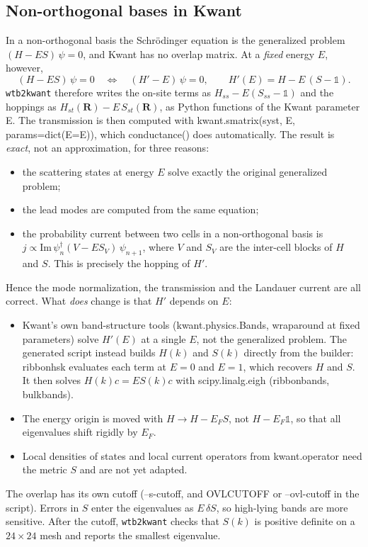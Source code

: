 \documentclass[11pt,a4paper]{article}
\newcommand{\code}[1]{{\ttfamily\def\_{\textunderscore\allowbreak}\def\slash{/\allowbreak}#1}}
\newcommand{\tool}{\texttt{wtb2kwant}}
\begin{document}
\subsection{Non-orthogonal bases in Kwant}\label{sec:nonortho}
In a non-orthogonal basis the Schrödinger equation is the generalized problem
$(H - E S)\,\psi = 0$, and Kwant has no overlap matrix. At a \emph{fixed} energy $E$,
however,
\begin{equation}
  (H - E S)\,\psi = 0 \quad\Longleftrightarrow\quad (H' - E)\,\psi = 0, \qquad
  H'(E) = H - E\,(S - \mathbb{1}).
\end{equation}
\tool{} therefore writes the on-site terms as $H_{ss} - E(S_{ss}-\mathbb{1})$ and the
hoppings as $H_{st}(\mathbf{R}) - E\,S_{st}(\mathbf{R})$, as Python functions of the
Kwant parameter \code{E}. The transmission is then computed with
\code{kwant.smatrix(syst, E, params=dict(E=E))}, which \code{conductance()} does
automatically. The result is \emph{exact}, not an approximation, for three reasons:
\begin{itemize}[nosep]
  \item the scattering states at energy $E$ solve exactly the original generalized problem;
  \item the lead modes are computed from the same equation;
  \item the probability current between two cells in a non-orthogonal basis is
        $j \propto \mathrm{Im}\,\psi_n^\dagger (V - E S_V)\,\psi_{n+1}$, where $V$ and $S_V$
        are the inter-cell blocks of $H$ and $S$. This is precisely the hopping of $H'$.
\end{itemize}
Hence the mode normalization, the transmission and the Landauer current are all correct.
What \emph{does} change is that $H'$ depends on $E$:
\begin{itemize}[nosep]
  \item Kwant's own band-structure tools (\code{kwant.physics.Bands}, \code{wraparound}
        at fixed parameters) solve $H'(E)$ at a single $E$, not the generalized problem.
        The generated script instead builds $H(k)$ and $S(k)$ directly from the builder:
        \code{ribbon\_hsk} evaluates each term at $E=0$ and $E=1$, which recovers $H$ and
        $S$. It then solves $H(k)c=ES(k)c$ with \code{scipy.linalg.eigh}
        (\code{ribbon\_bands}, \code{bulk\_bands}).
  \item The energy origin is moved with $H \to H - E_F S$, not $H - E_F\mathbb{1}$, so
        that all eigenvalues shift rigidly by $E_F$.
  \item Local densities of states and local current operators from \code{kwant.operator}
        need the metric $S$ and are not yet adapted.
\end{itemize}
The overlap has its own cutoff (\code{--s-cutoff}, and \code{OVL\_CUTOFF} or
\code{--ovl-cutoff} in the script). Errors in $S$ enter the eigenvalues as $E\,\delta S$,
so high-lying bands are more sensitive. After the cutoff, \tool{} checks that $S(k)$ is
positive definite on a $24\times24$ mesh and reports the smallest eigenvalue.
\end{document}
